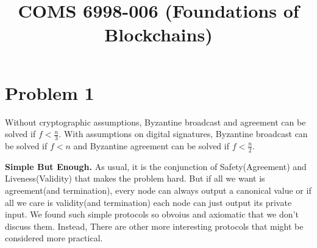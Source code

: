 \documentclass{article}
\title{COMS 6998-006 (Foundations of Blockchains) \par \exerciseset}
\author{\FirstAuther \qquad  \SecondAuther}
\begin{document}
\maketitle

\section*{Problem 1}
Without cryptographic assumptions, Byzantine broadcast and agreement can be
solved if $f < \frac{n}{3}$. With assumptions on digital signatures, Byzantine broadcast
can be solved if $f < n$ and Byzantine agreement can be solved if $f < \frac{n}{2}$.

\textbf{Simple But Enough.} As usual, it is the conjunction of Safety(Agreement) and Liveness(Validity) that makes the problem hard.  But if all we want is agreement(and termination), every node can always output a canonical value or if all we care is validity(and termination) each node can just output its private input. We found such simple protocols so obvoius and axiomatic that we don't discuss them. Instead, There are other more interesting protocols that might be considered more practical.
\end{document}
